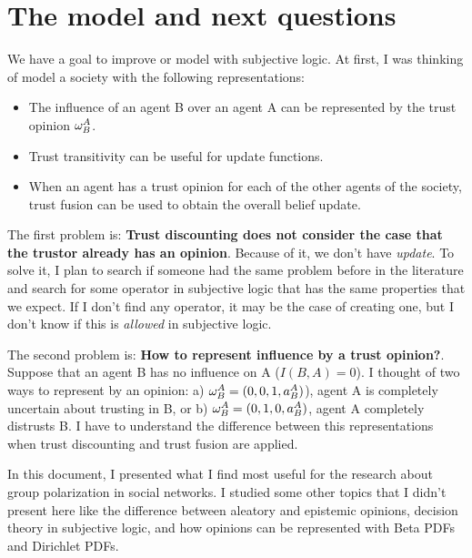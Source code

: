 \documentclass[a4paper,12pt]{article}
\theoremstyle{definition}
\numberwithin{equation}{section}
\begin{document}
\section{The model and next questions}

We have a goal to improve or model with subjective logic. At first, I was thinking of model a society with the following representations:
\begin{itemize}
	\item The influence of an agent B over an agent A can be represented by the trust opinion $\omega^{A}_{B}$.
	
	\item Trust transitivity can be useful for update functions.
	
	\item When an agent has a trust opinion for each of the other agents of the society, trust fusion can be used to obtain the overall belief update.
\end{itemize}

The first problem is: \textbf{Trust discounting does not consider the case that the trustor already has an opinion}. Because of it, we don't have \emph{update}. To solve it, I plan to search if someone had the same problem before in the literature and search for some operator in subjective logic that has the same properties that we expect. If I don't find any operator, it may be the case of creating one, but I don't know if this is \emph{allowed} in subjective logic.

The second problem is: \textbf{How to represent influence by a trust opinion?}. Suppose that an agent B has no influence on A ($I(B, A) = 0$). I thought of two ways to represent by an opinion: a) $\omega^{A}_{B} = (0, 0, 1, a^A_B)$), agent A is completely uncertain about trusting in B, or b) $\omega^{A}_{B} = (0, 1, 0, a^A_B)$, agent A completely distrusts B. I have to understand the difference between this representations when trust discounting and trust fusion are applied.

In this document, I presented what I find most useful for the research about group polarization in social networks. I studied some other topics that I didn't present here like the difference between aleatory and epistemic opinions, decision theory in subjective logic, and how opinions can be represented with Beta PDFs and Dirichlet PDFs.
\end{document}
